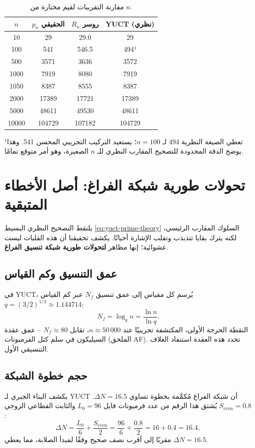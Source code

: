 \documentclass[11pt,a4paper]{article}
\newcommand{\Seven}{S_{\mathrm{even}}}
\begin{document}
	\begin{table}[htbp]
		\centering
		\caption{مقارنة التقريبات لقيم مختارة من $n$.}
		\label{tab:comparison}
		\small
		\begin{tabular}{c c c c}
			\toprule
			$n$ & $p_n$ الحقيقي & $R_n$ روسر & YUCT (نظري) \\
			\midrule
			10   & 29      & 29.0  & 29  \\
			100  & 541     & 546.5 & 494¹ \\
			500  & 3571    & 3636  & 3572 \\
			1000 & 7919    & 8080  & 7919 \\
			1050 & 8387    & 8555  & 8387 \\
			2000 & 17389   & 17721 & 17389\\
			5000 & 48611   & 49530 & 48611\\
			10000& 104729  & 107182& 104729\\
			\bottomrule
		\end{tabular}
		\par\smallskip
		\footnotesize
		¹تعطي الصيغة النظرية 494 لـ $n=100$؛ يستعيد التركيب التجريبي المحسن 541. وهذا يوضح الدقة المحدودة للتصحيح المقارب النظري للـ $n$ الصغيرة، وهو أمر متوقع تمامًا.
	\end{table}
	
	\section{تحولات طورية شبكة الفراغ: أصل الأخطاء المتبقية}
	\label{sec:phasetrans}
	يلتقط التصحيح النظري البسيط \eqref{eq:yuct-prime-theory} السلوك المقارب الرئيسي، لكنه يترك بقايا تتذبذب وتقلب الإشارة أحيانًا. يكشف تحقيقنا أن هذه القلبات ليست عشوائية؛ إنها مظاهر \textbf{لتحولات طورية شبكة تنسيق الفراغ}.
	
	\subsection{عمق التنسيق وكم القياس}
	في YUCT، يُرسم كل مقياس إلى عمق تنسيق $N_f$ عبر كم القياس $q = (3/2)^{1/3} \approx 1.144714$:
	\[
	N_f = \log_q n = \frac{\ln n}{\ln q}.
	\]
	النقطة الحرجة الأولى، المكتشفة تجريبيًا عند $n \approx 50\,000$، تقابل $N_f \approx 80$ – عمق عقدة السيليكون في سلم كتل الفرميونات (الملحق AF). تحدد هذه العقدة استنفاد الغلاف التنسيقي الأول.
	
	\subsection{حجم خطوة الشبكة}
	يكشف البناء الجبري لـ YUCT أن شبكة الفراغ مُكمَّمة بخطوة تساوي $\Delta N = 16.5$. يُشتق هذا الرقم من عدد فرميونات فايل $L_0 = 96$ والثابت القطاعي الزوجي $\Seven = 0.8$:
	\[
	\Delta N = \frac{L_0}{6} + \frac{\Seven}{2} = \frac{96}{6} + \frac{0.8}{2} = 16 + 0.4 = 16.4,
	\]
	مقربًا إلى أقرب نصف صحيح وفقًا لمبدأ الصلابة، مما يعطي $\Delta N = 16.5$.
	
\end{document}
